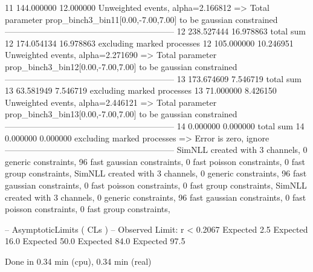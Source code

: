 11         144.000000      12.000000       Unweighted events, alpha=2.166812
  => Total parameter prop_binch3_bin11[0.00,-7.00,7.00] to be gaussian constrained
------------------------------------------------------------
12         238.527444      16.978863       total sum                     
12         174.054134      16.978863       excluding marked processes    
12         105.000000      10.246951       Unweighted events, alpha=2.271690
  => Total parameter prop_binch3_bin12[0.00,-7.00,7.00] to be gaussian constrained
------------------------------------------------------------
13         173.674609      7.546719        total sum                     
13         63.581949       7.546719        excluding marked processes    
13         71.000000       8.426150        Unweighted events, alpha=2.446121
  => Total parameter prop_binch3_bin13[0.00,-7.00,7.00] to be gaussian constrained
------------------------------------------------------------
14         0.000000        0.000000        total sum                     
14         0.000000        0.000000        excluding marked processes    
  => Error is zero, ignore      
------------------------------------------------------------
SimNLL created with 3 channels, 0 generic constraints, 96 fast gaussian constraints, 0 fast poisson constraints, 0 fast group constraints, 
SimNLL created with 3 channels, 0 generic constraints, 96 fast gaussian constraints, 0 fast poisson constraints, 0 fast group constraints, 
SimNLL created with 3 channels, 0 generic constraints, 96 fast gaussian constraints, 0 fast poisson constraints, 0 fast group constraints, 

 -- AsymptoticLimits ( CLs ) --
Observed Limit: r < 0.2067
Expected  2.5%
Expected 16.0%
Expected 50.0%
Expected 84.0%
Expected 97.5%

Done in 0.34 min (cpu), 0.34 min (real)
